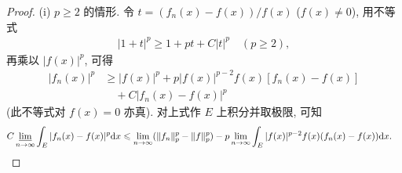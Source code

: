 \documentclass[../../main.tex]{subfiles}%
\begin{document}
\begin{proof}
(i) $p\geqslant 2$ 的情形. 令 $t=(f_n(x)-f(x))/f(x)$ ($f(x)\neq 0$), 用不等式
\begin{align}
|1+t|^p\geqslant 1+pt+C|t|^p\quad (p\geqslant 2), \label{eq:radon1}
\end{align}
再乘以 $|f(x)|^p$, 可得
\begin{align*}
|f_n(x)|^p &\geqslant |f(x)|^p + p|f(x)|^{p-2}f(x)[f_n(x)-f(x)] \\
&\quad + C|f_n(x)-f(x)|^p
\end{align*}
(此不等式对 $f(x)=0$ 亦真). 对上式作 $E$ 上积分并取极限, 可知
\begin{align*}
C\varliminf_{n\to\infty}\int_E |f_n(x)-f(x)|^p\mathrm{d}x
&\leqslant \lim_{n\to\infty}(\|f_n\|_p^p-\|f\|_p^p) - p\lim_{n\to\infty}\int_E |f(x)|^{p-2}f(x)(f_n(x)-f(x))\mathrm{d}x.
\end{align*}


\end{proof}
\end{document}
